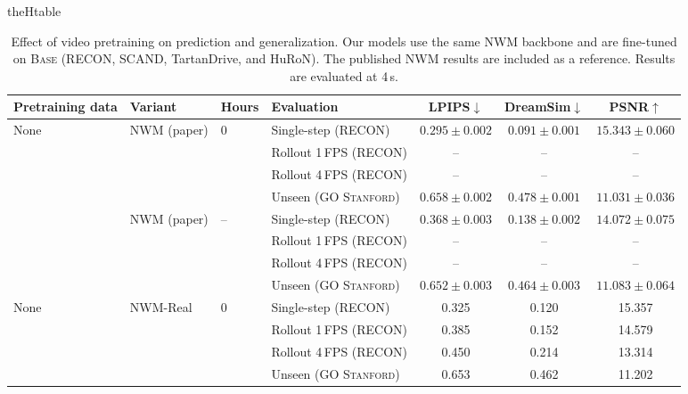 \documentclass{article}
\newcommand{\BaseData}{\textsc{Base}}
\newcommand{\UnseenData}{\textsc{GO Stanford}}
\newcommand{\LPIPS}{LPIPS$\downarrow$}
\newcommand{\DreamSim}{DreamSim$\downarrow$}
\newcommand{\PSNR}{PSNR$\uparrow$}
\newcommand{\tablepart}[1]{%
  \renewcommand{\thetable}{\arabic{table}#1}%
  \ifcsname theHtable\endcsname
    \renewcommand{\theHtable}{\arabic{table}.#1}%
  \fi
}
\begin{document}
\begin{table}[t]
  \tablepart{a}
  \caption{Effect of video pretraining on prediction and generalization.
  Our models use the same NWM backbone and are fine-tuned on \BaseData{}
  (RECON, SCAND, TartanDrive, and HuRoN). The published NWM results are included
  as a reference. Results are evaluated at 4\,s.}
  \label{tab:pretraining_prediction}
  \centering
  \scriptsize
  \setlength{\tabcolsep}{4.2pt}
  \renewcommand{\arraystretch}{0.98}
  \begin{threeparttable}
    \begin{tabular}{lll lccc}
      \toprule
      Pretraining data & Variant & Hours & Evaluation
      & \LPIPS & \DreamSim & \PSNR \\
      \midrule
      \multirow{4}{*}{None}
      & \multirow{4}{*}{NWM (paper)\tnote{a}} & \multirow{4}{*}{0}
      & Single-step (RECON) & $0.295{\pm}0.002$ & $0.091{\pm}0.001$ & $15.343{\pm}0.060$ \\
      & & & Rollout 1\,FPS (RECON) & -- & -- & -- \\
      & & & Rollout 4\,FPS (RECON) & -- & -- & -- \\
      & & & Unseen (\UnseenData{}) & $0.658{\pm}0.002$ & $0.478{\pm}0.001$ & $11.031{\pm}0.036$ \\
      \addlinespace[2pt]
      \multirow{4}{*}{Ego4D}
      & \multirow{4}{*}{NWM (paper)\tnote{a}} & \multirow{4}{*}{--}
      & Single-step (RECON) & $0.368{\pm}0.003$ & $0.138{\pm}0.002$ & $14.072{\pm}0.075$ \\
      & & & Rollout 1\,FPS (RECON) & -- & -- & -- \\
      & & & Rollout 4\,FPS (RECON) & -- & -- & -- \\
      & & & Unseen (\UnseenData{}) & $0.652{\pm}0.003$ & $0.464{\pm}0.003$ & $11.083{\pm}0.064$ \\
      \midrule
      \multirow{4}{*}{None}
      & \multirow{4}{*}{NWM-Real} & \multirow{4}{*}{0}
      & Single-step (RECON) & 0.325 & 0.120 & 15.357 \\
      & & & Rollout 1\,FPS (RECON) & 0.385 & 0.152 & 14.579 \\
      & & & Rollout 4\,FPS (RECON) & 0.450 & 0.214 & 13.314 \\
      & & & Unseen (\UnseenData{}) & 0.653 & 0.462 & 11.202 \\

\end{tabular}
\end{threeparttable}
\end{table}
\end{document}
